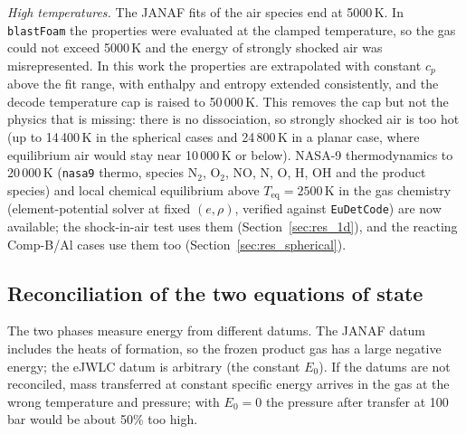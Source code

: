 \documentclass{article}
\begin{document}
\emph{High temperatures.} The JANAF fits of the air species end at 5000\,K. In \texttt{blastFoam} the properties were evaluated at the clamped temperature, so the gas could not exceed 5000\,K and the energy of strongly shocked air was misrepresented. In this work the properties are extrapolated with constant $c_p$ above the fit range, with enthalpy and entropy extended consistently, and the decode temperature cap is raised to 50\,000\,K. This removes the cap but not the physics that is missing: there is no dissociation, so strongly shocked air is too hot (up to 14\,400\,K in the spherical cases and 24\,800\,K in a planar case, where equilibrium air would stay near 10\,000\,K or below). NASA-9 thermodynamics to 20\,000\,K (\texttt{nasa9} thermo, species N$_2$, O$_2$, NO, N, O, H, OH and the product species) and local chemical equilibrium above $T_\text{eq} = 2500$\,K in the gas chemistry (element-potential solver at fixed $(e, \rho)$, verified against \texttt{EuDetCode}) are now available; the shock-in-air test uses them (Section~\ref{sec:res_1d}), and the reacting Comp-B/Al cases use them too (Section~\ref{sec:res_spherical}).

\subsection{Reconciliation of the two equations of state}
\label{sec:reconciliation}

The two phases measure energy from different datums. The JANAF datum includes the heats of formation, so the frozen product gas has a large negative energy; the eJWLC datum is arbitrary (the constant $E_0$). If the datums are not reconciled, mass transferred at constant specific energy arrives in the gas at the wrong temperature and pressure; with $E_0 = 0$ the pressure after transfer at 100\,bar would be about 50\% too high.
\end{document}
